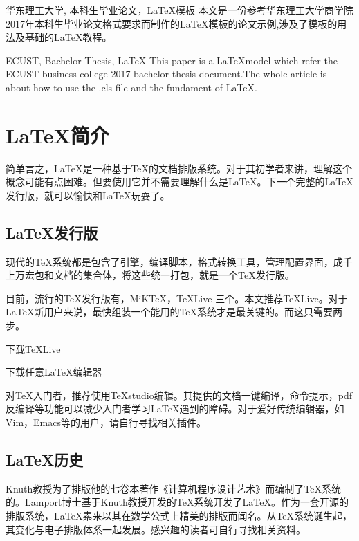 \documentclass{Ecust_Bachelor}
\begin{document}
    \begin{abstractzh}{华东理工大学, 本科生毕业论文，\LaTeX 模板}
        本文是一份参考华东理工大学商学院2017年本科生毕业论文格式要求而制作的\LaTeX 模板的论文示例,涉及了模板的用法及基础的\LaTeX 教程。
    \end{abstractzh}
    \begin{abstracten}{ECUST, Bachelor Thesis, \LaTeX}
        This paper is a \LaTeX model which refer the ECUST business college 2017 bachelor thesis document.The whole article is about how to use the .cls file and the fundament of \LaTeX .
    \end{abstracten}

    \mktableofcontents

    \section{\LaTeX 简介}
    简单言之，\LaTeX 是一种基于\TeX 的文档排版系统。对于其初学者来讲，理解这个概念可能有点困难。但要使用它并不需要理解什么是\LaTeX 。下一个完整的\LaTeX 发行版，就可以愉快和\LaTeX 玩耍了。

    \subsection{\LaTeX 发行版}
    现代的\TeX 系统都是包含了引擎，编译脚本，格式转换工具，管理配置界面，成千上万宏包和文档的集合体，将这些统一打包，就是一个\TeX 发行版。

    目前，流行的\TeX 发行版有\CTeX ，MiK\TeX ，\TeX Live 三个。本文推荐\TeX Live。对于\LaTeX 新用户来说，最快组装一个能用的\TeX 系统才是最关键的。而这只需要两步。
    \begin{compactenum}
        \item 下载\TeX Live
        \item 下载任意\LaTeX 编辑器
    \end{compactenum}
    对\TeX 入门者，推荐使用TeXstudio编辑。其提供的文档一键编译，命令提示，pdf反编译等功能可以减少入门者学习\LaTeX  遇到的障碍。对于爱好传统编辑器，如Vim，Emacs等的用户，请自行寻找相关插件。

    \subsection{\LaTeX 历史}
    Knuth教授为了排版他的七卷本著作《计算机程序设计艺术》而编制了\TeX 系统的。Lamport博士基于Knuth教授开发的\TeX 系统开发了\LaTeX。作为一套开源的排版系统，\LaTeX 素来以其在数学公式上精美的排版而闻名。从\TeX 系统诞生起，其变化与电子排版体系一起发展。感兴趣的读者可自行寻找相关资料。
\end{document}

